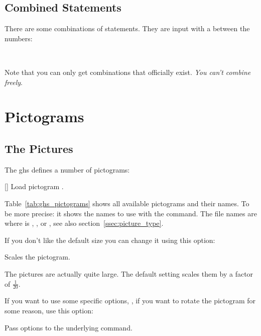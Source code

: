 \documentclass{ghsystem-manual}
\begin{document}
\subsection{Combined Statements}
There are some combinations of statements.  They are input with a \code{+}
between the numbers:
\begin{example}
   \\
\end{example}

Note that you can only get combinations that officially exist.  \emph{You
  can't combine freely}.

\section{Pictograms}
\subsection{The Pictures}
The \ac{ghs} defines a number of pictograms:

    
   

\begin{commands}
  []
    Load pictogram .
\end{commands}
Table~\ref{tab:ghs_pictograms} shows all available pictograms and their names.
To be more precise: it shows the names to use with the  command.
The file names are  where
 is , ,  or , see also
section~\ref{ssec:picture_type}.
\begin{example}
\end{example}

If you don't like the default size you can change it using this option:
\begin{options}
    Scales the pictogram.
\end{options}
The pictures are actually quite large.  The default setting scales them by a
factor of $\frac{1}{20}$.
\begin{example}
\end{example}

If you want to use some specific  options, \eg, if
you want to rotate the pictogram for some reason, use this option:
\begin{options}
    Pass options to the underlying  command.
\end{options}
\begin{example}
\end{example}
\end{document}
